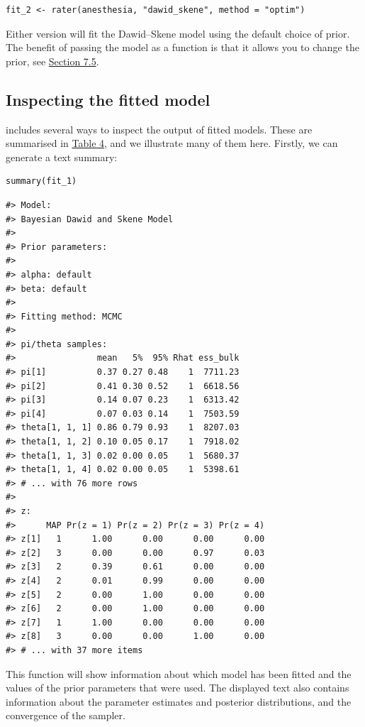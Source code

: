 \begin{verbatim}
fit_2 <- rater(anesthesia, "dawid_skene", method = "optim")
\end{verbatim}

Either version will fit the Dawid--Skene model using the default choice of
prior. The benefit of passing the model as a function is that it allows you to
change the prior, see \protect\hyperlink{sec:different-models-priors}{Section 7.5}.

\hypertarget{inspecting-the-fitted-model}{%
\subsection{Inspecting the fitted model}\label{inspecting-the-fitted-model}}

 includes several ways to inspect the output of fitted models.
These are summarised in \protect\hyperlink{tab:inspecting-fitted-models}{Table 4}, and we
illustrate many of them here. Firstly, we can generate a text summary:

\begin{verbatim}
summary(fit_1)
\end{verbatim}

\begin{verbatim}
#> Model:
#> Bayesian Dawid and Skene Model 
#> 
#> Prior parameters:
#> 
#> alpha: default
#> beta: default
#> 
#> Fitting method: MCMC
#> 
#> pi/theta samples:
#>                mean   5%  95% Rhat ess_bulk
#> pi[1]          0.37 0.27 0.48    1  7711.23
#> pi[2]          0.41 0.30 0.52    1  6618.56
#> pi[3]          0.14 0.07 0.23    1  6313.42
#> pi[4]          0.07 0.03 0.14    1  7503.59
#> theta[1, 1, 1] 0.86 0.79 0.93    1  8207.03
#> theta[1, 1, 2] 0.10 0.05 0.17    1  7918.02
#> theta[1, 1, 3] 0.02 0.00 0.05    1  5680.37
#> theta[1, 1, 4] 0.02 0.00 0.05    1  5398.61
#> # ... with 76 more rows
#> 
#> z:
#>      MAP Pr(z = 1) Pr(z = 2) Pr(z = 3) Pr(z = 4)
#> z[1]   1      1.00      0.00      0.00      0.00
#> z[2]   3      0.00      0.00      0.97      0.03
#> z[3]   2      0.39      0.61      0.00      0.00
#> z[4]   2      0.01      0.99      0.00      0.00
#> z[5]   2      0.00      1.00      0.00      0.00
#> z[6]   2      0.00      1.00      0.00      0.00
#> z[7]   1      1.00      0.00      0.00      0.00
#> z[8]   3      0.00      0.00      1.00      0.00
#> # ... with 37 more items
\end{verbatim}

This function will show information about which model has been fitted and the
values of the prior parameters that were used. The displayed text also contains
information about the parameter estimates and posterior distributions, and the
convergence of the sampler.


